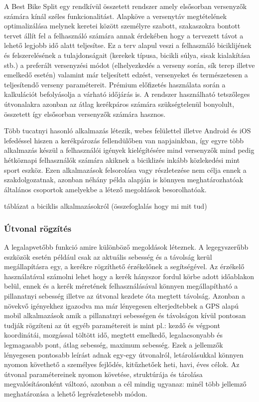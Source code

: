 A Best Bike Split \cite{bestbikesplit} egy rendkívül összetett rendszer amely elsősorban versenyzők számára kínál széles funkcionalitást. Alapköve a versenytáv megtételének optimalizálása melynek keretei között személyre szabott, szakaszokra bontott tervet állít fel a felhasználó számára annak érdekében hogy a tervezett távot a lehető legjobb idő alatt teljesítse. Ez a terv alapul veszi a felhasználó biciklijének és felszerelésének a tulajdonságait (kerekek típusa, bicikli súlya, sisak kialakítása stb.) a preferált versenyzési módot (elhelyezkedés a verseny során, sík terep illetve emelkedő esetén) valamint már teljesített edzést, versenyeket és természetesen a teljesítendő verseny paramétereit. Prémium előfizetés használata során a kalkulációt befolyásolja a várható időjárás is. A rendszer használható tetszőleges útvonalakra azonban az átlag kerékpáros számára szükségtelenül bonyolult, összetett így elsősorban versenyzők számára hasznos.

Több tucatnyi hasonló alkalmazás létezik, webes felülettel illetve Android és iOS lefedéssel hiszen a kerékpározás fellendülőben van napjainkban, így egyre több alkalmazás készül a felhasználói igények kielégítésére mind versenyzők mind pedig hétköznapi felhasználók számára akiknek a biciklizés inkább közlekedési mint sport eszköz. Ezen alkalmazások felsorolása vagy részletezése nem célja ennek a szakdolgozatnak, azonban néhány példa alapján is könnyen meghatározhatóak általános csoportok amelyekbe a létező megoldások besorolhatóak.

\TODO táblázat a biciklis alkalmazásokról (összefoglalás hogy mi mit tud)

\subsubsection{Útvonal rögzítés} 
A legalapvetőbb funkció amire különböző megoldások léteznek. A legegyszerűbb eszközök esetén például csak az aktuális sebesség és a távolság kerül megállapításra egy, a kerékre rögzíthető érzékelőnek a segítségével. Az érzékelő használatával számolni lehet hogy a kerék hányszor fordul körbe adott időablakon belül, ennek és a kerék méretének felhasználásával könnyen megállapítható a pillanatnyi sebesség illetve az útvonal kezdete óta megtett távolság. Azonban a növekvő igényekhez igazodva ma már lényegesen elterjedtebbek a GPS alapú mobil alkalmazások amik a pillanatnyi sebességen és távolságon kívül pontosan tudják rögzíteni az út egyéb paramétereit is mint pl.: kezdő és végpont koordinátái, mozgással töltött idő, megtett emelkedő, legalacsonyabb és legmagasabb pont, átlag sebesség, maximum sebesség. Ezek a jellemzők lényegesen pontosabb leírást adnak egy-egy útvonalról, letárolásukkal könnyen nyomon követhető a személyes fejlődés, kitűzhetőek heti, havi, éves célok. Az útvonal paramétereinek nyomon követése, struktúrája és tárolása megvalósításonként változó, azonban a cél mindig ugyanaz: minél több jellemző meghatározása a lehető legrészletesebb módon.

